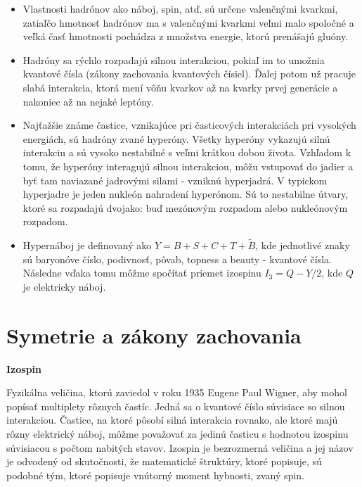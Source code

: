 \documentclass[../../main.tex]{subfiles}
\begin{document}
\begin{itemize}
	\item Vlastnosti hadrónov ako náboj, spin, atď. sú určene valenčnými kvarkmi, zatiaľčo hmotnosť hadrónov ma s valenčnými kvarkmi veľmi malo spoločné a veľká časť hmotnosti pochádza z množstva energie, ktorú prenášajú gluóny.
	\item Hadróny sa rýchlo rozpadajú silnou interakciou, pokiaľ im to umožnia kvantové čísla (zákony zachovania kvantových čísiel). Ďalej potom už pracuje slabá interakcia, ktorá mení vôňu kvarkov až na kvarky prvej generácie a nakoniec až na nejaké leptóny.
	\item Najťažšie známe častice, vznikajúce pri časticových interakciách pri vysokých energiách, sú hadróny zvané hyperóny. Všetky hyperóny vykazujú silnú interakciu a sú vysoko nestabilné s veľmi krátkou dobou života. Vzhľadom k tomu, že hyperóny interagujú silnou interakciou, môžu vstupovať do jadier a byť tam naviazané jadrovými silami - vzniknú hyperjadrá. V typickom hyperjadre je jeden nukleón nahradení hyperónom. Sú to nestabilne útvary, ktoré sa rozpadajú dvojako: buď mezónovým rozpadom alebo nukleónovým rozpadom.
	\item Hypernáboj je definovaný ako $Y=B+S+C+T+\tilde{B}$, kde jednotlivé znaky sú baryonóve číslo, podivnosť, pôvab, topness a beauty - kvantové čísla. Následne vďaka tomu môžme spočítať priemet izospinu $I_3=Q-Y/2$, kde $Q$ je elektricky náboj.
\end{itemize}

\section{Symetrie a zákony zachovania}
\textbf{Izospin}\par
Fyzikálna veličina, ktorú zaviedol v roku 1935 Eugene Paul Wigner, aby mohol popísať multiplety rôznych častíc. Jedná sa o kvantové číslo súvisiace so silnou interakciou. Častice, na ktoré pôsobí silná interakcia rovnako, ale ktoré majú rôzny elektrický náboj, môžme považovať za jedinú časticu s hodnotou izospinu súvisiacou s počtom nabitých stavov. Izospin je bezrozmerná veličina a jej názov je odvodený od skutočnosti, že matematické štruktúry, ktoré popisuje, sú podobné tým, ktoré popisuje vnútorný moment hybnosti, zvaný spin.
\end{document}
